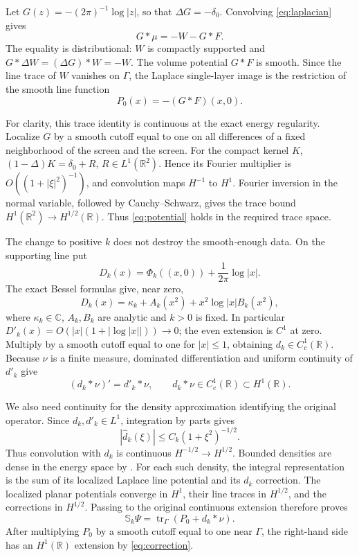 \documentclass[11pt]{article}
\newcommand{\R}{\mathbb R}
\newcommand{\tr}{\operatorname{tr}}
\begin{document}
Let \(G(z)=-(2\pi)^{-1}\log|z|\), so that \(\Delta G=-\delta_0\).
Convolving \eqref{eq:laplacian} gives
\begin{equation}\label{eq:potential}
 G*\mu=-W-G*F .
\end{equation}
The equality is distributional: \(W\) is compactly supported and
\(G*\Delta W=(\Delta G)*W=-W\). The volume potential \(G*F\) is smooth.
Since the line trace of \(W\) vanishes on \(\Gamma\), the Laplace
single-layer image is the restriction of the smooth line function
\[
 P_0(x)=-(G*F)(x,0).
\]

For clarity, this trace identity is continuous at the exact energy
regularity. Localize \(G\) by a smooth cutoff equal to one on all
differences of a fixed neighborhood of the screen and the screen.
For the compact kernel \(K\),
\((1-\Delta)K=\delta_0+R\), \(R\in L^1(\R^2)\).
Hence its Fourier multiplier is \(O((1+|\xi|^2)^{-1})\), and convolution
maps \(H^{-1}\) to \(H^1\). Fourier inversion in the normal variable,
followed by Cauchy--Schwarz, gives the trace bound
\(H^1(\R^2)\to H^{1/2}(\R)\). Thus \eqref{eq:potential} holds in the
required trace space.

The change to positive \(k\) does not destroy the smooth-enough data.
On the supporting line put
\[
 D_k(x)=\Phi_k((x,0))+\frac1{2\pi}\log|x|.
\]
The exact Bessel formulas \cite[10.2.2, 10.4.3, 10.8.2]{DLMF} give,
near zero,
\begin{equation}\label{eq:bessel}
 D_k(x)=\kappa_k+A_k(x^2)+x^2\log|x|B_k(x^2),
\end{equation}
where \(\kappa_k\in\mathbb C\), \(A_k,B_k\) are analytic and \(k>0\) is fixed.
In particular \(D'_k(x)=O(|x|(1+|\log|x||))\to0\); the even extension
is \(C^1\) at zero.
Multiply by a smooth cutoff equal to one for \(|x|\le1\), obtaining
\(d_k\in C^1_c(\R)\). Because \(\nu\) is a finite measure,
dominated differentiation and uniform continuity of \(d'_k\) give
\begin{equation}\label{eq:correction}
 (d_k*\nu)'=d'_k*\nu,\qquad
 d_k*\nu\in C^1_c(\R)\subset H^1(\R).
\end{equation}

We also need continuity for the density approximation identifying the
original operator. Since \(d_k,d'_k\in L^1\), integration by parts gives
\[
 |\widehat d_k(\xi)|\le C_k(1+\xi^2)^{-1/2}.
\]
Thus convolution with \(d_k\) is continuous
\(H^{-1/2}\to H^{1/2}\). Bounded densities are dense in the energy space
by \cite[Theorem 2.7]{CGH}. For each such density, the integral
representation \cite[Theorem 4.6]{CGH} is the sum of its localized
Laplace line potential and its \(d_k\) correction.
The localized planar potentials converge in \(H^1\), their line traces
in \(H^{1/2}\), and the corrections in \(H^{1/2}\).
Passing to the original continuous extension therefore proves
\begin{equation}\label{eq:original-image}
 \mathbb S_k\Psi=\tr_\Gamma(P_0+d_k*\nu).
\end{equation}
After multiplying \(P_0\) by a smooth cutoff equal to one near \(\Gamma\),
the right-hand side has an \(H^1(\R)\) extension by
\eqref{eq:correction}.
\end{document}
